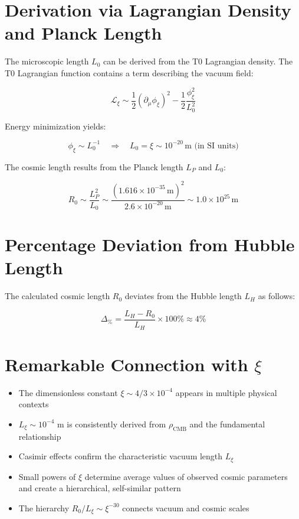 \documentclass[12pt,a4paper]{article}
\numberwithin{equation}{section}
\begin{document}
	\section{Derivation via Lagrangian Density and Planck Length}
	
	The microscopic length $L_0$ can be derived from the T0 Lagrangian density. The T0 Lagrangian function contains a term describing the vacuum field:
	
	\[
	\mathcal{L}_{\xi} \sim \frac{1}{2} (\partial_\mu \phi_\xi)^2 - \frac{1}{2} \frac{\phi_\xi^2}{L_0^2}
	\]
	
	Energy minimization yields:
	
	\[
	\phi_\xi \sim L_0^{-1} \quad \Rightarrow \quad L_0 = \xi \sim 10^{-20}\,\text{m (in SI units)}
	\]
	
	The cosmic length results from the Planck length $L_P$ and $L_0$:
	
	\[
	R_0 \sim \frac{L_P^2}{L_0} \sim \frac{(1.616 \times 10^{-35}\,\text{m})^2}{2.6 \times 10^{-20}\,\text{m}} \sim 1.0 \times 10^{25}\,\text{m}
	\]
	
	\section{Percentage Deviation from Hubble Length}
	
	The calculated cosmic length $R_0$ deviates from the Hubble length $L_H$ as follows:
	
	\[
	\Delta_{\%} = \frac{L_H - R_0}{L_H} \times 100\% \approx 4\%
	\]
	
	\section{Remarkable Connection with $\xi$}
	
	\begin{itemize}
		\item The dimensionless constant $\xi \sim 4/3 \times 10^{-4}$ appears in multiple physical contexts
		\item $L_\xi \sim 10^{-4}$ m is consistently derived from $\rho_{\text{CMB}}$ and the fundamental relationship
		\item Casimir effects confirm the characteristic vacuum length $L_\xi$
		\item Small powers of $\xi$ determine average values of observed cosmic parameters and create a hierarchical, self-similar pattern
		\item The hierarchy $R_0 / L_\xi \sim \xi^{-30}$ connects vacuum and cosmic scales
	\end{itemize}
	
\end{document}
